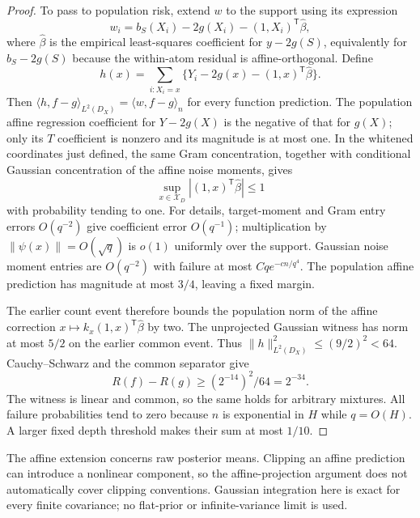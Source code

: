 \begin{proof}
To pass to population risk, extend $w$ to the support using its expression
\[
 w_i=b_S(X_i)-2g(X_i)-(1,X_i)^{\mathsf T}\widehat\beta,
\]
where $\widehat\beta$ is the empirical least-squares coefficient for $y-2g(S)$, equivalently for $b_S-2g(S)$ because the within-atom residual is affine-orthogonal. Define
\[
 h(x)=\sum_{i:X_i=x}\{Y_i-2g(x)-(1,x)^{\mathsf T}\widehat\beta\}.
\]
Then $\langle h,f-g\rangle_{L^2(D_X)}=\langle w,f-g\rangle_n$ for every function prediction.
The population affine regression coefficient for $Y-2g(X)$ is the negative of that for $g(X)$; only its $T$ coefficient is nonzero and its magnitude is at most one. In the whitened coordinates just defined, the same Gram concentration, together with conditional Gaussian concentration of the affine noise moments, gives
\[
 \sup_{x\in\mathcal X_D}|(1,x)^{\mathsf T}\widehat\beta|\le1
\]
with probability tending to one. For details, target-moment and Gram entry errors $O(q^{-2})$ give coefficient error $O(q^{-1})$; multiplication by $\|\psi(x)\|=O(\sqrt q)$ is $o(1)$ uniformly over the support. Gaussian noise moment entries are $O(q^{-2})$ with failure at most $Cq e^{-c n/q^4}$. The population affine prediction has magnitude at most $3/4$, leaving a fixed margin.

The earlier count event therefore bounds the population norm of the affine correction $x\mapsto k_x(1,x)^{\mathsf T}\widehat\beta$ by two. The unprojected Gaussian witness has norm at most $5/2$ on the earlier common event. Thus $\|h\|_{L^2(D_X)}^2\le(9/2)^2<64$. Cauchy--Schwarz and the common separator give
\[
 R(f)-R(g)\ge (2^{-14})^2/64=2^{-34}.
\]
The witness is linear and common, so the same holds for arbitrary mixtures. All failure probabilities tend to zero because $n$ is exponential in $H$ while $q=O(H)$. A larger fixed depth threshold makes their sum at most $1/10$.
\end{proof}

The affine extension concerns raw posterior means. Clipping an affine prediction can introduce a nonlinear component, so the affine-projection argument does not automatically cover clipping conventions. Gaussian integration here is exact for every finite covariance; no flat-prior or infinite-variance limit is used.
